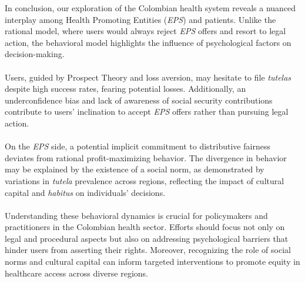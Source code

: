 \documentclass[12pt]{article}
\begin{document}
\begin{flushleft}

    In conclusion, our exploration of the Colombian health system reveals a nuanced interplay among Health Promoting Entities (\textit{EPS}) and patients. Unlike the rational model, where users would always reject \textit{EPS} offers and resort to legal action, the behavioral model highlights the influence of psychological factors on decision-making.\\~\\

    Users, guided by Prospect Theory and loss aversion, may hesitate to file \textit{tutelas} despite high success rates, fearing potential losses. Additionally, an underconfidence bias and lack of awareness of social security contributions contribute to users' inclination to accept \textit{EPS} offers rather than pursuing legal action.\\~\\

    On the \textit{EPS} side, a potential implicit commitment to distributive fairness deviates from rational profit-maximizing behavior. The divergence in behavior may be explained by the existence of a social norm, as demonstrated by variations in \textit{tutela} prevalence across regions, reflecting the impact of cultural capital and \textit{habitus} on individuals' decisions.\\~\\

    Understanding these behavioral dynamics is crucial for policymakers and practitioners in the Colombian health sector. Efforts should focus not only on legal and procedural aspects but also on addressing psychological barriers that hinder users from asserting their rights. Moreover, recognizing the role of social norms and cultural capital can inform targeted interventions to promote equity in healthcare access across diverse regions.\\~\\

\end{flushleft}

\newpage

\medskip

\nocite{*}
\printbibliography
\newpage
\end{document}
